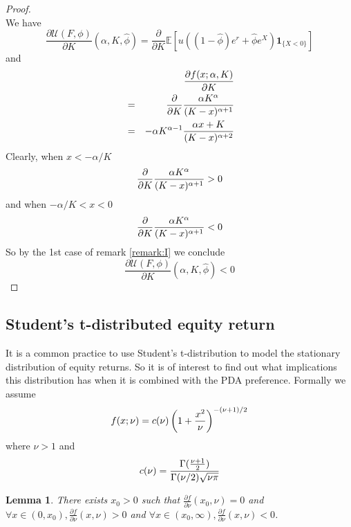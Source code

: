 \documentclass{article}
\newcommand{\pd}[2]{
  \frac{\partial #1}{\partial #2}
}
\newcommand{\opd}[1]{
  \frac{\partial}{\partial #1}
}
\newcommand{\E}{
  \mathbb{E}
}
\newcommand{\1}[1]{
  \mathbf{1}_{\{#1\}}
}
\newtheorem{lemma}{Lemma}
\begin{document}
\begin{proof}
\[  \]
  We have
  \[
  \pd{\mathcal U(F, \phi)}{K}(\alpha, K, \hat\phi)
  = \opd{K} \E \left[
    u((1 - \hat\phi) e^r + \hat\phi e^X) \1{X < 0}
  \right] 
  \]
  and
  \begin{eqnarray*}
    && \pd{f(x; \alpha, K)}{K} \\
    &=& \opd{K} {\alpha K^\alpha \over (K - x)^{\alpha + 1}} \\
    &=&
    -\alpha K^{\alpha - 1} {
      \alpha x + K
      \over
      (K - x)^{\alpha + 2}
    }
  \end{eqnarray*}
  Clearly, when $x < -\alpha/K$
  \[
  \opd{K} {\alpha K^\alpha \over (K - x)^{\alpha + 1}} > 0
  \]
  and when $-\alpha/K < x < 0$
  \[
  \opd{K} {\alpha K^\alpha \over (K - x)^{\alpha + 1}} < 0
  \]
  So by the 1st case of remark \ref{remark:I} we conclude
  \[
  \pd{\mathcal U(F, \phi)}{K}(\alpha, K, \hat\phi) < 0  
  \]
\end{proof}

\subsection{Student's t-distributed equity return}
It is a common practice to use Student's t-distribution to model the
stationary distribution of equity returns. So it is of interest to
find out what implications this distribution has when it is combined
with the PDA preference. Formally we assume
\[
f(x; \nu) = c(\nu) \left(
  1 + {x^2 \over \nu}
\right)^{-(\nu + 1)/2}
\]
where $\nu > 1$ and
\[
c(\nu) = {
  \Gamma({\nu + 1 \over 2})
  \over
  \Gamma(\nu/2) \sqrt{\nu \pi}
}
\]
\begin{lemma}
  \label{lemma:II}
  There exists $x_0 > 0$ such that $\pd{f}{\nu}(x_0, \nu) = 0$ and
  $\forall x \in (0, x_0), \pd{f}{\nu}(x, \nu) > 0$ and
  $\forall x \in (x_0, \infty), \pd{f}{\nu}(x, \nu) < 0$.
\end{lemma}
\end{document}
